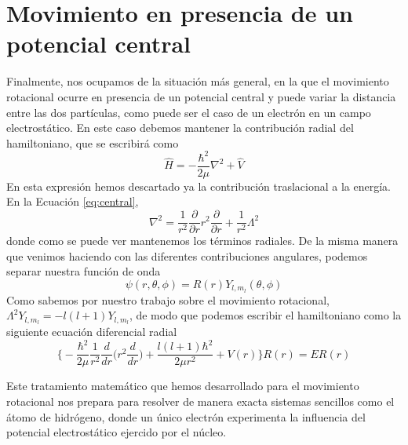 \documentclass{tufte-handout}
\begin{document}
\section{Movimiento en presencia de un potencial central}
Finalmente, nos ocupamos de la situación más general,
en la que el movimiento rotacional ocurre en presencia
de un potencial central y puede variar la distancia 
entre las dos partículas, como puede ser el caso de un
electrón en un campo electrostático. En este caso debemos
mantener la contribución radial del hamiltoniano, que
se escribirá como
\begin{equation}
    \hat{H} = -\frac{\hbar^2}{2\mu}\nabla^2 + \hat{V}
    \label{eq:central}
\end{equation}
En esta expresión hemos descartado ya la contribución
traslacional a la energía. En la Ecuación \ref{eq:central},
\begin{equation}
        \nabla^2=\frac{1}{r^2}\frac{\partial}{\partial r}r^2\frac{\partial}{\partial r} + \frac{1}{r^2}\Lambda^2
\end{equation}
donde como se puede ver mantenemos los términos radiales.
De la misma manera que venimos haciendo con las diferentes
contribuciones angulares, podemos separar nuestra función
de onda
\begin{equation}
    \psi(r,\theta, \phi)=R(r)Y_{l,m_l}(\theta, \phi)
\end{equation}
Como sabemos por nuestro trabajo sobre el movimiento 
rotacional, $\Lambda^2Y_{l,m_l}=-l(l+1)Y_{l,m_l}$, de modo 
que podemos escribir el hamiltoniano como la siguiente
ecuación diferencial radial
\begin{equation}
    \bigg\{-\frac{\hbar^2}{2\mu}\frac{1}{r^2}\frac{d}{dr}\bigg(r^2\frac{d}{dr}\bigg) + \frac{l(l+1)\hbar^2}{2\mu r^2} + V(r)\bigg\}R(r)=ER(r)
\end{equation}

Este tratamiento matemático que hemos desarrollado
para el movimiento rotacional nos prepara para resolver
de manera exacta sistemas sencillos como el átomo de 
hidrógeno, donde un único electrón experimenta la
influencia del potencial electrostático ejercido por 
el núcleo.


%
%
%

\end{document}

